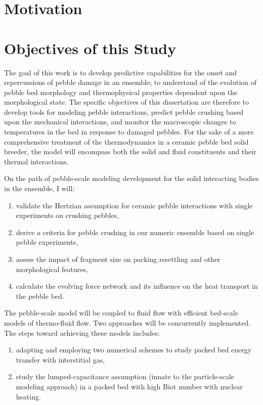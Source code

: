 \section{Motivation}\label{sec:motivation}





\section{Objectives of this Study}\label{sec:intro-scope-of-work}
The goal of this work is to develop predictive capabilities for the onset and repercussions of pebble damage in an ensemble; to understand of the evolution of pebble bed morphology and thermophysical properties dependent upon the morphological state. The specific objectives of this dissertation are therefore to develop tools for modeling pebble interactions, predict pebble crushing based upon the mechanical interactions, and monitor the macroscopic changes to temperatures in the bed in response to damaged pebbles. For the sake of a more comprehensive treatment of the thermodynamics in a ceramic pebble bed solid breeder, the model will encompass both the solid and fluid constituents and their thermal interactions.

On the path of pebble-scale modeling development for the solid interacting bodies in the ensemble, I will:
\begin{enumerate}
	\item validate the Hertzian assumption for ceramic pebble interactions with single experiments on crushing pebbles,
	\item derive a criteria for pebble crushing in our numeric ensemble based on single pebble experiments,
	\item assess the impact of fragment size on packing resettling and other morphological features,
	\item calculate the evolving force network and its influence on the heat transport in the pebble bed.
\end{enumerate}

The pebble-scale model will be coupled to fluid flow with efficient bed-scale models of thermo-fluid flow. Two approaches will be concurrently implemented. The steps toward achieving these models includes:
\begin{enumerate}
	\item adapting and employing two numerical schemes to study packed bed energy transfer with interstitial gas,
	\item study the lumped-capacitance assumption (innate to the particle-scale modeling approach) in a packed bed with high Biot number with nuclear heating.
\end{enumerate}

